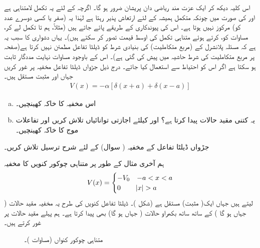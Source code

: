   اس کلیہ دیکھ کر ایک عزت مند ریاضی دان پریشان ضرور ہو گا۔ اگرچہ  کے لئے یہ تکمل لامتناہی ہے اور  کی صورت میں چونکہ متکمل ہمیشہ کے لئے ارتعاش پذیر رہتا ہے لہٰذا یہ (صفر یا کسی دوسرے عدد کو) مرکوز نہیں ہوتا ہے۔ اس کی پیوندکاری کے طریقے پائے جاتے ہیں (مثلاً، ہم  تا  تکمل لے کر، مساوات  کو،  کرتے ہوئے متناہی تکمل کی اوسط قیمت تصور کر سکتے ہیں)۔ یہاں دشواری کا سبب یہ ہے کہ مسئلہ پلانشرل کے (مربع متکاملیت) کی بنیادی شرط کو ڈیلٹا تفاعل مطمئن نہیں کرتا ہے(صفحہ  پر مربع متکاملیت کی شرط حاشیہ میں پیش کی گئی ہے)۔ اس کے باوجود مساوات  نہایت مددگار ثابت ہو سکتا ہے اگر اس کو احتیاط سے استعمال کیا جائے۔
درج ذیل جڑواں ڈیلٹا تفاعل مخفیہ پر غور کریں جہاں اور  مثبت مستقل ہیں۔
\begin{align*}
V(x)=-\alpha[\delta(x+a)+\delta(x-a)]
\end{align*}
\begin{enumerate}[a.]
\item
 اس مخفیہ کا خاکہ کھینچیں۔
\item
 یہ کتنی مقید حالات پیدا کرتا ہے؟  اور کیلئے اجازتی توانائیاں تلاش کریں اور تفاعلات موج کا خاکہ کھینچیں۔
\end{enumerate}
جڑواں ڈیلٹا تفاعل کے مخفیہ ( سوال) کے لئے شرح ترسیل تلاش کریں۔ 

 ہم آخری مثال کے طور پر متناہی چوکور کنویں کا مخفیہ
\begin{align}\label{مساوات_شروڈنگر_متناہی_چکور_کنواں_مخفیہ}
V(x)=
 \begin{cases} 
 -V_{0} & -a< x< a \\
 0 & \abs{x}> a
 \end{cases}
\end{align}
لیتے ہیں جہاں ایک( مثبت) مستقل ہے (شکل )۔ ڈیلٹا تفاعل کنویں کی طرح یہ مخفیہ مقید حالات ( جہاں ہو گا ) کے ساتھ ساتھ بکھراو حالات ( جہاں ہو گا) بھی پیدا کرتا ہے۔ ہم پہلے مقید حالات پر غور کرتے ہیں۔
 
\begin{figure}
\centering
{}
\caption{متناہی چوکور کنواں (مساوات )۔}
\label{شکل_غیر_تابع_متناہی_کنواں}
\end{figure}
 
